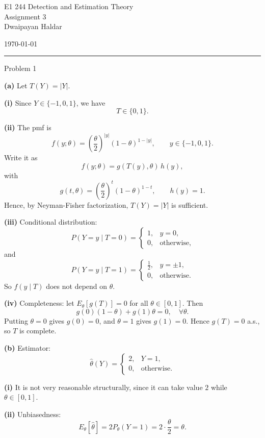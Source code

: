 \documentclass[12pt,a4paper,onecolumn]{exam}
\newcommand{\questionheader}[1]{%
  \begin{tcolorbox}[
    enhanced,
    colback=black,
    coltext=white,
    boxrule=0pt,
    fontupper=\Large\bfseries,
    arc=4mm
  ]
  #1
  \end{tcolorbox}%
}
\begin{document}
\begingroup
    \centering
    \LARGE E1 244 Detection and Estimation Theory\\
    \LARGE Assignment 3\\[0.5em]
    \large Dwaipayan Haldar\par
    \large \today\\[0.5em] 
\endgroup
\noindent\rule{\textwidth}{0.5pt}
\printanswers
\renewcommand{\solutiontitle}{\noindent\textbf{Ans:}\enspace}



\questionheader{Problem 1}

\begin{solution}
\textbf{(a)} Let $T(Y)=|Y|$.

\textbf{(i)} Since $Y\in\{-1,0,1\}$, we have
\[
T\in\{0,1\}.
\]

\textbf{(ii)} The pmf is
\[
f(y;\theta)=\left(\frac{\theta}{2}\right)^{|y|}(1-\theta)^{1-|y|},\qquad y\in\{-1,0,1\}.
\]
Write it as
\[
f(y;\theta)=g(T(y),\theta)\,h(y),
\]
with
\[
g(t,\theta)=\left(\frac{\theta}{2}\right)^t(1-\theta)^{1-t},\qquad h(y)=1.
\]
Hence, by Neyman-Fisher factorization, $T(Y)=|Y|$ is sufficient.

\textbf{(iii)} Conditional distribution:
\[
P(Y=y\mid T=0)=
\begin{cases}
1,&y=0,\\
0,&\text{otherwise},
\end{cases}
\]
and
\[
P(Y=y\mid T=1)=
\begin{cases}
\frac12,&y=\pm1,\\
0,&\text{otherwise}.
\end{cases}
\]
So $f(y\mid T)$ does not depend on $\theta$.

\textbf{(iv)} Completeness: let $E_\theta[g(T)]=0$ for all $\theta\in[0,1]$. Then
\[
g(0)(1-\theta)+g(1)\theta=0,\quad \forall\theta.
\]
Putting $\theta=0$ gives $g(0)=0$, and $\theta=1$ gives $g(1)=0$. Hence $g(T)=0$ a.s., so $T$ is complete.

\vspace{0.5em}
\textbf{(b)} Estimator:
\[
\hat\theta(Y)=
\begin{cases}
2,&Y=1,\\
0,&\text{otherwise}.
\end{cases}
\]

\textbf{(i)} It is not very reasonable structurally, since it can take value $2$ while $\theta\in[0,1]$.

\textbf{(ii)} Unbiasedness:
\[
E_\theta[\hat\theta]=2P_\theta(Y=1)=2\cdot\frac{\theta}{2}=\theta.
\]


\end{solution}
\end{document}
